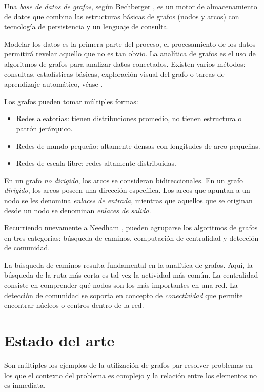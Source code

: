 \documentclass[11pt,letterpaper,oneside]{article}
\begin{document}
Una \textit{base de datos de grafos}, según Bechberger \cite{Bechberger-2020}, es un motor de almacenamiento de datos que combina las estructuras básicas de grafos (nodos y arcos) con tecnología de persistencia y un lenguaje de consulta.

Modelar los datos es la primera parte del proceso, el procesamiento de los datos permitirá revelar aquello que no es tan obvio. La analítica de grafos es el uso de algoritmos de grafos para analizar datos conectados. Existen varios métodos: consultas. estadísticas básicas, exploración visual del grafo o tareas de aprendizaje automático, véase \cite{Robinson-2013}.

Los grafos pueden tomar múltiples formas:
\begin{itemize}
\item Redes aleatorias: tienen distribuciones promedio, no tienen estructura o patrón jerárquico.
\item Redes de mundo pequeño: altamente densas con longitudes de arco pequeñas.
\item Redes de escala libre: redes altamente distribuidas.
\end{itemize}


En un grafo \textit{no dirigido}, los arcos se consideran bidireccionales. En un grafo \textit{dirigido}, los arcos poseen una dirección específica. Los arcos que apuntan a un nodo se les denomina \textit{enlaces de entrada}, mientras que aquellos que se originan desde un nodo se denominan \textit{enlaces de salida}.

Recurriendo nuevamente a Needham \cite{Needham-2019}, pueden agruparse los algoritmos de grafos en tres categorías: búsqueda de caminos, computación de centralidad y detección de comunidad.

La búsqueda de caminos resulta fundamental en la analítica de grafos. Aquí, la búsqueda de la ruta más corta es tal vez la actividad más común. La centralidad consiste en comprender qué nodos son los más importantes en una red. La detección de comunidad se soporta en concepto de \textit{conectividad} que permite encontrar núcleos o centros dentro de la red.

\newpage
\section{Estado del arte}
Son múltiples los ejemplos de la utilización de grafos par resolver problemas en los que el contexto del problema es complejo y la relación entre los elementos no es inmediata.
\end{document}
